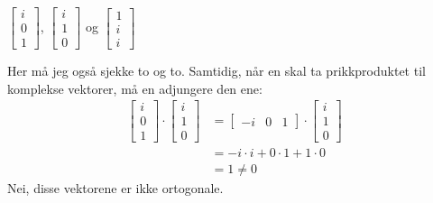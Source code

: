 \documentclass[11pt, a4paper, norsk]{NTNUoving}
\begin{document}
\begin{oppgave}
\begin{punkt}
       \end{punkt}
       \begin{punkt}
           $\begin{bmatrix}
               i \\
               0 \\
               1
           \end{bmatrix}$, $\begin{bmatrix}
               i \\
               1 \\
               0
           \end{bmatrix}$ og $\begin{bmatrix}
               1 \\
               i \\
               i
           \end{bmatrix}$

           Her må jeg også sjekke to og to. Samtidig, når en skal ta prikkproduktet til komplekse vektorer, må en adjungere den ene:
           \begin{align*}
               \begin{bmatrix}
                   i \\
                   0 \\
                   1
               \end{bmatrix} \cdot \begin{bmatrix}
                   i \\
                   1 \\
                   0
               \end{bmatrix} &= \begin{bmatrix}
               -i & 0 & 1
               \end{bmatrix} \cdot \begin{bmatrix}
                   i \\
                   1 \\
                   0
               \end{bmatrix}
               \\
               &= -i \cdot i + 0 \cdot 1 + 1\cdot 0
               \\
               &= 1 \neq 0
           \end{align*}
           Nei, disse vektorene er ikke ortogonale.
       \end{punkt}
   \end{oppgave}
\end{document}
